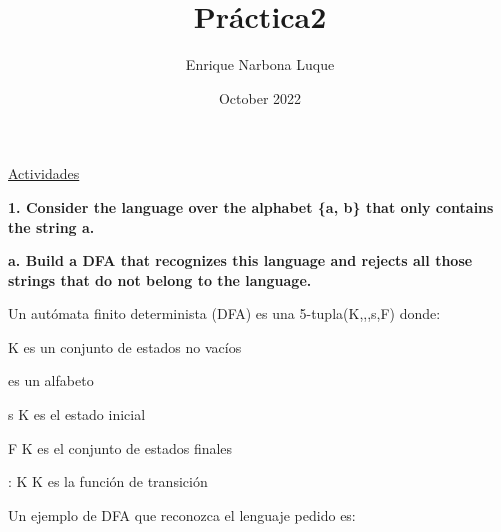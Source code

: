 \documentclass{article}
\title{Práctica2}
\author{Enrique Narbona Luque}
\date{October 2022}
\begin{document}
\maketitle

\LARGE
\titl\underline{Actividades}

\vspace{4mm}

\normalsize
\RaggedRight

\textbf{1. Consider the language over the alphabet \{a, b\} that only contains the string a.}

\vspace{4mm}

\textbf{a. Build a DFA that recognizes this language and rejects all those strings that do not belong to the language.}

\vspace{5mm}

Un autómata finito determinista (DFA) es una 5-tupla(K,\sum,\delta,s,F) donde:

\vspace{4mm}

K es un conjunto de estados no vacíos

\vspace{4mm}

\sum es un alfabeto

\vspace{4mm}

s \in K es el estado inicial

\vspace{4mm}

F \subseteq K es el conjunto de estados finales

\vspace{4mm}

\delta : K \times \sum \rightarrow K es la función de transición

\vspace{4mm}

\newpage
\RaggedRight

Un ejemplo de DFA que reconozca el lenguaje pedido es:

\vspace{3mm}


\vspace{5mm}
\end{document}
